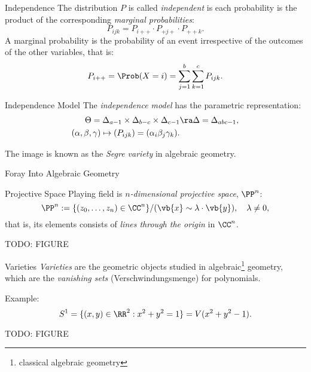 \begin{frame}{Independence}
    The distribution $P$ is called \emph{independent} is each probability is the product of the corresponding \emph{marginal probabilities}:
    $$ P_{ijk} = P_{i++} \cdot P_{+j+} \cdot P_{++k}. $$
    A marginal probability is the probability of an event irrespective of the outcomes of the other variables, that is:
    $$ P_{i++} = \Prob(X = i) = \sum_{j=1}^{b} \sum_{k=1}^{c} P_{ijk}. $$
\end{frame}

\begin{frame}{Independence Model}
    The \emph{independence model} has the parametric representation:
    \begin{equation*}
        \begin{split}
            \Theta = \Delta_{a-1} \times \Delta_{b-c} \times \Delta_{c-1} &\ra \Delta = \Delta_{abc - 1}, \\
            (\alpha,\beta,\gamma) \mapsto (P_{ijk}) = (\alpha_{i}\beta_{j}\gamma_{k}).
        \end{split}
    \end{equation*}

    The image is known as the \emph{Segre variety} in algebraic geometry.
\end{frame}

\begin{frame}{Foray Into Algebraic Geometry}
    \begin{block}{Projective Space}
    Playing field is $n$\emph{-dimensional projective space}, $\PP^{n}$:
        $$ \PP^{n} := \{ (z_{0}, \ldots, z_{n}) \in \CC^{n} \} / (\vb{x} \sim \lambda \cdot \vb{y}), \quad \lambda \neq 0, $$
    that is, its elements consists of \emph{lines through the origin} in $\CC^{n}$.
    \end{block}
    
    TODO: FIGURE
\end{frame}

\begin{frame}{Varieties}
        \emph{Varieties} are the geometric objects studied in algebraic\footnote{classical algebraic geometry} geometry, which are the \emph{vanishing sets} (Verschwindungsmenge) for polynomials.

        Example:
        $$ S^{1} = \{ (x,y) \in \RR^{2} : x^{2} + y^{2} = 1 \} = V( x^{2} + y^{2} - 1 ). $$

    TODO: FIGURE
\end{frame}


